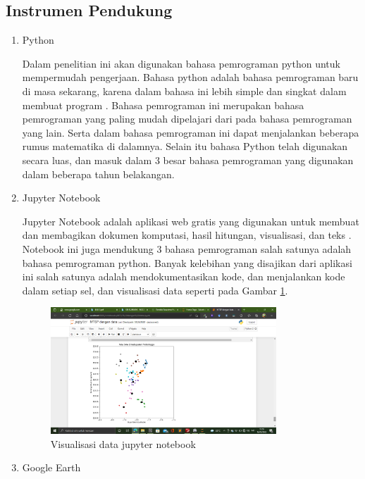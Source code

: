 \subsection{Instrumen Pendukung}
\begin{enumerate}
    \item Python
    
    Dalam penelitian ini akan digunakan bahasa pemrograman python untuk mempermudah pengerjaan. Bahasa python adalah bahasa pemrograman baru di masa sekarang, karena dalam bahasa ini lebih simple dan singkat dalam membuat program \cite{syahrudin2018input}. Bahasa pemrograman ini merupakan bahasa pemrograman yang paling mudah dipelajari dari pada bahasa pemrograman yang lain. Serta dalam bahasa pemrograman ini dapat menjalankan beberapa rumus matematika di dalamnya. Selain itu bahasa Python telah digunakan secara luas, dan masuk dalam 3 besar bahasa pemrograman yang digunakan dalam beberapa tahun belakangan.
    
    \item Jupyter Notebook
    
    Jupyter Notebook adalah aplikasi web gratis yang digunakan untuk membuat dan membagikan dokumen komputasi, hasil hitungan, visualisasi, dan teks \cite{Kluyver2016jupyter}. Notebook ini juga mendukung 3 bahasa pemrograman salah satunya adalah bahasa pemrograman python. Banyak kelebihan yang disajikan dari aplikasi ini salah satunya adalah mendokumentasikan kode, dan menjalankan kode dalam setiap sel, dan visualisasi data seperti pada Gambar \ref{fig:visjupyter}.

\begin{figure}[H]
  \centering
  \includegraphics[width=0.8\textwidth]{Gambar/visualisasi jupyter.png}
  \caption{Visualisasi data jupyter notebook}
  \label{fig:visjupyter}
\end{figure}

	\item Google Earth
	

\end{enumerate}
